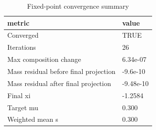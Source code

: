 \begin{table}

\caption{Fixed-point convergence summary}
\centering
\begin{tabular}[t]{ll}
\toprule
metric & value\\
\midrule
Converged & TRUE\\
Iterations & 26\\
Max composition change & 6.34e-07\\
Mass residual before final projection & -9.6e-10\\
Mass residual after final projection & -9.48e-10\\
Final xi & -1.2584\\
Target mu & 0.300\\
Weighted mean s & 0.300\\
\bottomrule
\end{tabular}
\end{table}
